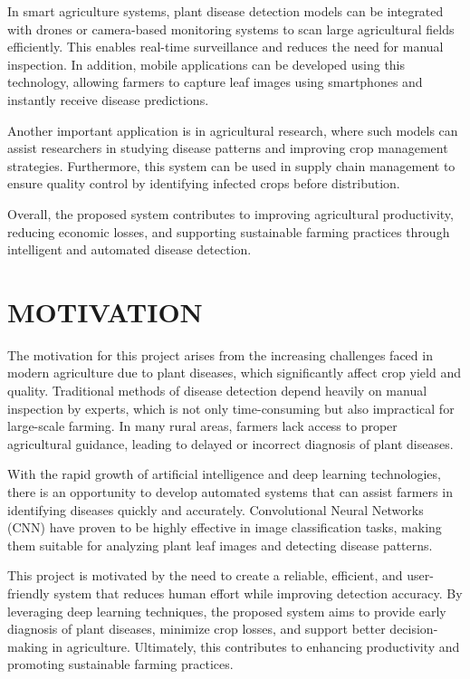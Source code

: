 \documentclass[12pt]{report}
\begin{document}
In smart agriculture systems, plant disease detection models can be integrated with drones or camera-based monitoring systems to scan large agricultural fields efficiently. This enables real-time surveillance and reduces the need for manual inspection. In addition, mobile applications can be developed using this technology, allowing farmers to capture leaf images using smartphones and instantly receive disease predictions.

Another important application is in agricultural research, where such models can assist researchers in studying disease patterns and improving crop management strategies. Furthermore, this system can be used in supply chain management to ensure quality control by identifying infected crops before distribution.

Overall, the proposed system contributes to improving agricultural productivity, reducing economic losses, and supporting sustainable farming practices through intelligent and automated disease detection.

\section{MOTIVATION}
The motivation for this project arises from the increasing challenges faced in modern agriculture due to plant diseases, which significantly affect crop yield and quality. Traditional methods of disease detection depend heavily on manual inspection by experts, which is not only time-consuming but also impractical for large-scale farming. In many rural areas, farmers lack access to proper agricultural guidance, leading to delayed or incorrect diagnosis of plant diseases.

With the rapid growth of artificial intelligence and deep learning technologies, there is an opportunity to develop automated systems that can assist farmers in identifying diseases quickly and accurately. Convolutional Neural Networks (CNN) have proven to be highly effective in image classification tasks, making them suitable for analyzing plant leaf images and detecting disease patterns.

This project is motivated by the need to create a reliable, efficient, and user-friendly system that reduces human effort while improving detection accuracy. By leveraging deep learning techniques, the proposed system aims to provide early diagnosis of plant diseases, minimize crop losses, and support better decision-making in agriculture. Ultimately, this contributes to enhancing productivity and promoting sustainable farming practices.
\end{document}
